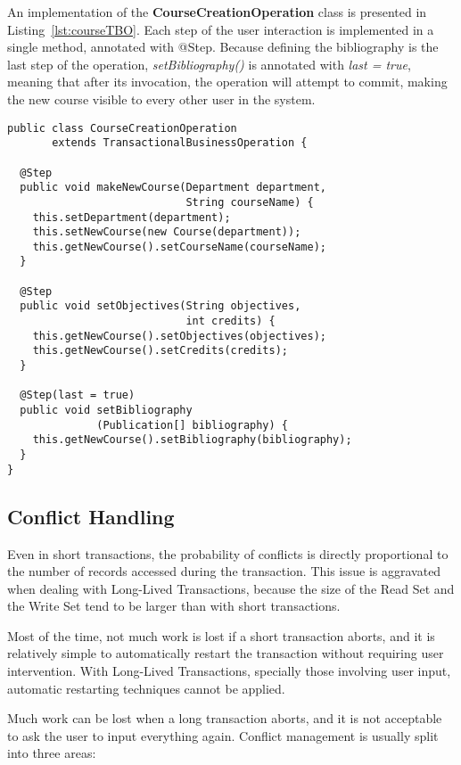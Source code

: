 \documentclass{llncs}
\begin{document}
An implementation of the {\bf CourseCreationOperation} class is
presented in Listing~\ref{lst:courseTBO}. Each step of the user
interaction is implemented in a single method, annotated with
@Step. Because defining the bibliography is the last step of the
operation, {\it setBibliography()} is annotated with {\it last =
  true}, meaning that after its invocation, the operation will attempt
to commit, making the new course visible to every other user in the
system.

\begin{lstlisting}[float]
public class CourseCreationOperation 
       extends TransactionalBusinessOperation {    

  @Step
  public void makeNewCourse(Department department,
                            String courseName) {
    this.setDepartment(department);
    this.setNewCourse(new Course(department));
    this.getNewCourse().setCourseName(courseName);
  }

  @Step
  public void setObjectives(String objectives,
                            int credits) {
    this.getNewCourse().setObjectives(objectives);
    this.getNewCourse().setCredits(credits);
  }

  @Step(last = true)
  public void setBibliography
              (Publication[] bibliography) {
    this.getNewCourse().setBibliography(bibliography);
  }
}
\end{lstlisting}

\subsection{Conflict Handling}

Even in short transactions, the probability of conflicts is directly
proportional to the number of records accessed during the
transaction. This issue is aggravated when dealing with Long-Lived
Transactions, because the size of the Read Set and the Write Set tend
to be larger than with short transactions.

Most of the time, not much work is lost if a short transaction aborts,
and it is relatively simple to automatically restart the transaction
without requiring user intervention. With Long-Lived Transactions,
specially those involving user input, automatic restarting techniques
cannot be applied.

Much work can be lost when a long transaction aborts, and it is not
acceptable to ask the user to input everything again. Conflict
management is usually split into three areas:
\end{document}

